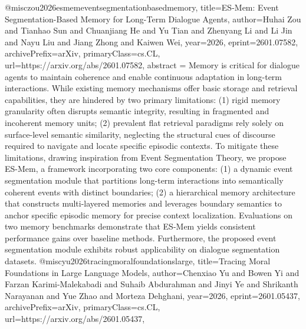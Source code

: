 {}@misc{zou2026esmemeventsegmentationbasedmemory,
      title={ES-Mem: Event Segmentation-Based Memory for Long-Term Dialogue Agents}, 
      author={Huhai Zou and Tianhao Sun and Chuanjiang He and Yu Tian and Zhenyang Li and Li Jin and Nayu Liu and Jiang Zhong and Kaiwen Wei},
      year={2026},
      eprint={2601.07582},
      archivePrefix={arXiv},
      primaryClass={cs.CL},
      url={https://arxiv.org/abs/2601.07582},
      abstract = {Memory is critical for dialogue agents to maintain coherence and enable continuous adaptation in long-term interactions. While existing memory mechanisms offer basic storage and retrieval capabilities, they are hindered by two primary limitations: (1) rigid memory granularity often disrupts semantic integrity, resulting in fragmented and incoherent memory units; (2) prevalent flat retrieval paradigms rely solely on surface-level semantic similarity, neglecting the structural cues of discourse required to navigate and locate specific episodic contexts. To mitigate these limitations, drawing inspiration from Event Segmentation Theory, we propose ES-Mem, a framework incorporating two core components: (1) a dynamic event segmentation module that partitions long-term interactions into semantically coherent events with distinct boundaries; (2) a hierarchical memory architecture that constructs multi-layered memories and leverages boundary semantics to anchor specific episodic memory for precise context localization. Evaluations on two memory benchmarks demonstrate that ES-Mem yields consistent performance gains over baseline methods. Furthermore, the proposed event segmentation module exhibits robust applicability on dialogue segmentation datasets.}
}@misc{yu2026tracingmoralfoundationslarge,
      title={Tracing Moral Foundations in Large Language Models}, 
      author={Chenxiao Yu and Bowen Yi and Farzan Karimi-Malekabadi and Suhaib Abdurahman and Jinyi Ye and Shrikanth Narayanan and Yue Zhao and Morteza Dehghani},
      year={2026},
      eprint={2601.05437},
      archivePrefix={arXiv},
      primaryClass={cs.CL},
      url={https://arxiv.org/abs/2601.05437},
}
